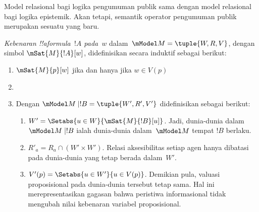 \documentclass[../../../include/open-logic-section]{subfiles}
\begin{document}


Model relasional bagi logika pengumuman publik sama dengan model relasional
bagi logika epistemik. Akan tetapi, semantik operator pengumuman publik
merupakan sesuatu yang baru.

\begin{defn} \emph{Kebenaran !!a{formula}~$!A$
  pada~$w$} dalam~$\mModel M=\tuple{W,R,V}$, dengan simbol
  $\mSat{M}{!A}[w]$, didefinisikan secara induktif sebagai berikut:
  \begin{enumerate}
  \item $\mSat{M}{p}[w]$ jika dan hanya jika $w\in V(p)$
  \item{}
  \item{}


  Dengan $\mModel M\mid !B=\tuple{W',R',V'}$ didefinisikan sebagai berikut:
  \begin{enumerate}
    \item $W'=\Setabs{u\in W}{\mSat{M}{!B}[u]}$. Jadi, dunia-dunia dalam
      $\mModel M\mid !B$ ialah dunia-dunia dalam~$\mModel M$ tempat $!B$
      berlaku.
    \item $R'_a=R_a\cap(W'\times W')$. Relasi aksesibilitas setiap agen hanya
      dibatasi pada dunia-dunia yang tetap berada dalam~$W'$.
    \item $V'(p)=\Setabs{u\in W'}{u\in V(p)}$. Demikian pula, valuasi
      proposisional pada dunia-dunia tersebut tetap sama. Hal ini
      merepresentasikan gagasan bahwa peristiwa informasional tidak mengubah
      nilai kebenaran variabel proposisional.
  \end{enumerate}

  \end{enumerate}
\end{defn}
\end{document}
